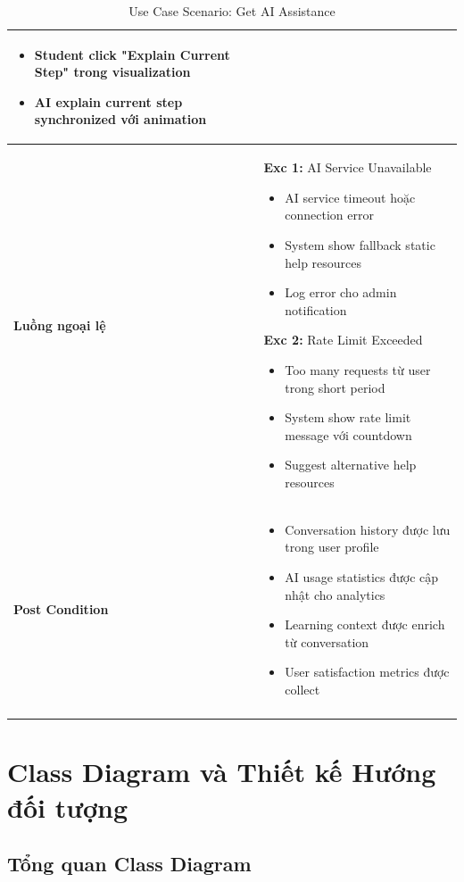 \begin{longtable}{| p{3cm} | p{10cm} |}
\begin{itemize}
    \item Student click "Explain Current Step" trong visualization
    \item AI explain current step synchronized với animation
\end{itemize} \\ \hline
\textbf{Luồng ngoại lệ} & 
\textbf{Exc 1:} AI Service Unavailable
\begin{itemize}
    \item AI service timeout hoặc connection error
    \item System show fallback static help resources
    \item Log error cho admin notification
\end{itemize}
\textbf{Exc 2:} Rate Limit Exceeded
\begin{itemize}
    \item Too many requests từ user trong short period
    \item System show rate limit message với countdown
    \item Suggest alternative help resources
\end{itemize} \\ \hline
\textbf{Post Condition} & 
\begin{itemize}
    \item Conversation history được lưu trong user profile
    \item AI usage statistics được cập nhật cho analytics
    \item Learning context được enrich từ conversation
    \item User satisfaction metrics được collect
\end{itemize} \\ \hline
\caption{Use Case Scenario: Get AI Assistance}
\label{tab:uc-ai-assistance} \\
\end{longtable}

\section{Class Diagram và Thiết kế Hướng đối tượng}
\label{sec:class-diagram}

\subsection{Tổng quan Class Diagram}
\label{subsec:class-overview}

